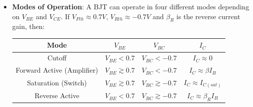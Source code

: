 \begin{itemize}
\begin{itemize}
\begin{itemize}
          \item \textbf{Under Forward Active Mode}:
            \begin{align*}
              V_{BE} = V_T \ln \left( \frac{I_C}{I_{S}} + 1 \right) \\
              V_{BC} \ll 0
            \end{align*}
          \item \textbf{Under Reverse Active Mode}:
            \begin{align*}
              V_{BE} \ll 0 \\
              V_{BC} = V_T \ln \left( \frac{I_C}{I_{S}} + 1 \right)
            \end{align*}
          \end{itemize}
      \item \textbf{Collector-Emitter \(V_{CE}\) Voltage}:
        The collector-emitter voltage is the voltage across the collector and
        emitter terminals. It is given by:
        \begin{align*}
          V_{CE} &= V_{BE} - V_{BC} \\
          V_{CE} &= V_B - V_E - (V_B - V_C) \\
          V_{CE} &= V_B - V_E - V_B + V_C \\
          V_{CE} &= V_C - V_E
        \end{align*}
    \end{itemize}
  \item \textbf{Modes of Operation}:
    A BJT can operate in four different modes depending on \(V_{BE}\) and
    \(V_{CE}\). If \(V_{Fth} \approx 0.7V\), \(V_{Rth} \approx -0.7 V\)
    and \(\beta_R\) is the reverse current gain, then:
    \begin{table}[H]
      \centering
      \begin{tabular}{|c|c|c|c|}\hline
        \textbf{Mode}              & \( V_{BE} \)        & \( V_{BC} \)             & \(I_{C}\) \\ \hline
        Cutoff                     & $V_{BE} < 0.7       $ & $V_{BC} < -0.7 $       & $I_C \approx 0$ \\ \hline
        Forward Active (Amplifier) & $V_{BE} \gtrsim 0.7 $ & $V_{BC} < -0.7 $       & $I_C \approx \beta I_B$ \\ \hline
        Saturation (Switch)        & $V_{BE} \gtrsim 0.7 $ & $V_{BC} \gtrsim -0.7 $ & $I_C \approx I_{C(sat)}$ \\ \hline
        Reverse Active             & $V_{BE} < 0.7       $ & $V_{BC} \gtrsim -0.7 $ & $I_C \approx \beta_R I_B$ \\ \hline

\end{tabular}
\end{table}
\end{itemize}
